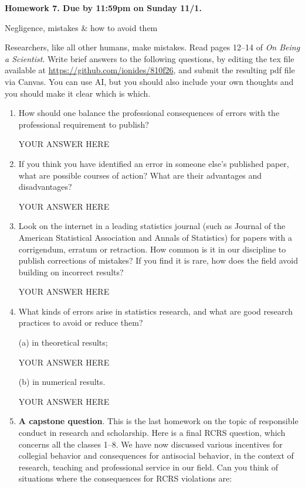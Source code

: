 \documentclass[12pt]{article}
\begin{document}
\begin{center}\bf
Homework 7. Due by 11:59pm on Sunday 11/1.

Negligence, mistakes \& how to avoid them

\end{center}
Researchers, like all other humans, make mistakes. Read pages 12--14 of {\em On Being a Scientist}.  Write brief answers to the following questions, by editing the tex file available at \url{https://github.com/ionides/810f26}, and submit the resulting pdf file via Canvas. You can use AI, but you should also include your own thoughts and you should make it clear which is which.

\begin{enumerate}

\item How should one balance the professional consequences of errors with the professional requirement to publish?
  
YOUR ANSWER HERE

\item If you think you have identified an error in someone else's published paper, what are possible courses of action? What are their advantages and disadvantages?

YOUR ANSWER HERE

\item Look on the internet in a leading statistics journal (such as Journal of the American Statistical Association and Annals of Statistics) for papers with a corrigendum, erratum or retraction. How common is it in our discipline to publish corrections of mistakes? If you find it is rare, how does the field avoid building on incorrect results?

YOUR ANSWER HERE

\item What kinds of errors arise in statistics research, and what are good research practices to avoid or reduce them?

(a) in theoretical results;

YOUR ANSWER HERE
    
(b) in numerical results.

YOUR ANSWER HERE

\item {\bf A capstone question}. This is the last homework on the topic of responsible conduct in research and scholarship.  Here is a final RCRS question, which concerns all the classes 1--8. We have now discussed various incentives for collegial behavior and consequences for antisocial behavior, in the context of research, teaching and professional service in our field. Can you think of situations where the consequences for RCRS violations are:


\end{enumerate}
\end{document}
